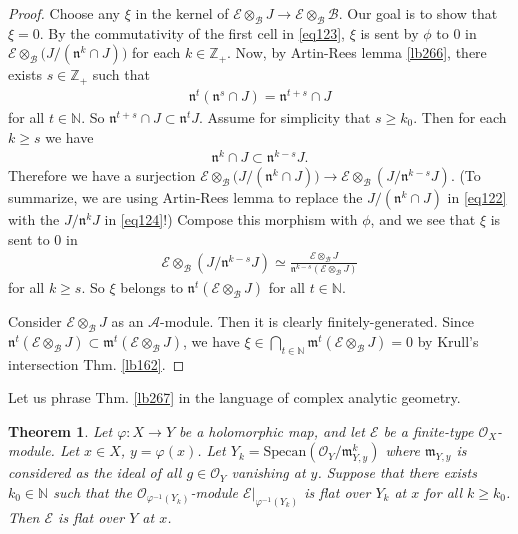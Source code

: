 \documentclass[12pt,b5paper,notitlepage]{report}
\theoremstyle{definition}
\theoremstyle{plain}
\newtheorem{thm}[df]{Theorem}
\newcommand{\fk}{\mathfrak}
\newcommand{\mc}{\mathcal}
\newcommand{\scr}{\mathscr}
\newcommand{\Nbb}{\mathbb N}
\newcommand{\Zbb}{\mathbb Z}
\newcommand{\Specan}{\mathrm{Specan}}
\newcommand{\mk}{\mathfrak m}
\numberwithin{equation}{section}
\begin{document}
\begin{proof}
Choose any $\xi$ in the kernel of $\mc E\otimes_{\mc B}J\rightarrow\mc E\otimes_{\mc B}\mc B$. Our goal is to show that $\xi=0$. By the commutativity of the first cell in \eqref{eq123}, $\xi$ is sent by $\phi$ to $0$ in $\mc E\otimes_{\mc B}\big(J/(\fk n^k\cap J)\big)$ for each $k\in\Zbb_+$.
Now, by Artin-Rees lemma \ref{lb266}, there exists $s\in\Zbb_+$ such that
\begin{align*}
\fk n^t(\fk n^s\cap J)=\fk n^{t+s}\cap J
\end{align*}
for all $t\in\Nbb$. So $\fk n^{t+s}\cap J\subset\fk n^tJ$. Assume for simplicity that $s\geq k_0$. Then for each $k\geq s$ we have
\begin{align*}
\fk n^k\cap J\subset\fk n^{k-s}J.
\end{align*}
Therefore we have a surjection $\mc E\otimes_{\mc B}\big(J/(\fk n^k\cap J)\big)\rightarrow \mc E\otimes_{\mc B}(J/\fk n^{k-s}J)$. (To summarize, we are using Artin-Rees lemma to replace the $J/(\fk n^k\cap J)$ in \eqref{eq122} with the $J/\fk n^kJ$ in \eqref{eq124}!) Compose this morphism with $\phi$, and we see that $\xi$ is sent to $0$ in
\begin{align*}
\mc E\otimes_{\mc B}(J/\fk n^{k-s}J)\simeq \frac{\mc E\otimes_{\mc B}J}{\fk n^{k-s}(\mc E\otimes_{\mc B}J)}
\end{align*}
for all $k\geq s$. So $\xi$ belongs to $\fk n^t(\mc E\otimes_{\mc B}J)$ for all $t\in\Nbb$. 

Consider $\mc E\otimes_{\mc B}J$ as an $\mc A$-module. Then it is clearly finitely-generated. Since $\fk n^t(\mc E\otimes_{\mc B}J)\subset \fk m^t(\mc E\otimes_{\mc B}J)$, we have $\xi\in\bigcap_{t\in\Nbb}\mk^t(\mc E\otimes_{\mc B}J)=0$ by Krull's intersection Thm. \ref{lb162}.
\end{proof}



Let us phrase Thm. \ref{lb267} in the language of complex analytic geometry.


\begin{thm}\label{lb270}
Let $\varphi:X\rightarrow Y$ be a holomorphic map, and let $\scr E$ be a finite-type $\scr O_X$-module. Let $x\in X$, $y=\varphi(x)$. Let $Y_k=\Specan(\scr O_Y/\fk m_{Y,y}^k)$ where $\fk m_{Y,y}$ is considered as the ideal of all $g\in\scr O_Y$ vanishing at $y$. Suppose that there exists $k_0\in\Nbb$ such that the $\scr O_{\varphi^{-1}(Y_k)}$-module $\scr E|_{\varphi^{-1}(Y_k)}$ is flat over $Y_k$ at $x$ for all $k\geq k_0$. Then $\scr E$ is flat over $Y$ at $x$.
\end{thm}
\end{document}
